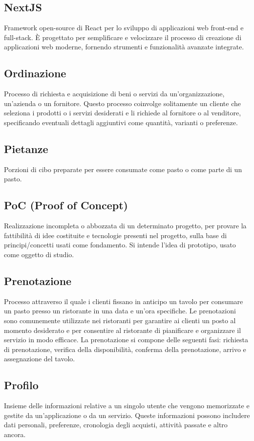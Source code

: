 \subsection{NextJS}Framework open-source di React per lo sviluppo di applicazioni web front-end e full-stack. È progettato per semplificare e velocizzare il processo di creazione di applicazioni web moderne, fornendo strumenti e funzionalità avanzate integrate.
\subsection{Ordinazione}Processo di richiesta e acquisizione di beni o servizi da un'organizzazione, un'azienda o un fornitore. Questo processo coinvolge solitamente un cliente che seleziona i prodotti o i servizi desiderati e li richiede al fornitore o al venditore, specificando eventuali dettagli aggiuntivi come quantità, varianti o preferenze.
\subsection{Pietanze}Porzioni di cibo preparate per essere consumate come pasto o come parte di un pasto.
\subsection{PoC (Proof of Concept)}Realizzazione incompleta o abbozzata di un determinato progetto, per provare la fattibilità di idee costituite e tecnologie presenti nel progetto, sulla base di principi/concetti usati come fondamento. Si intende l’idea di prototipo, usato come oggetto di studio.
\subsection{Prenotazione}Processo attraverso il quale i clienti fissano in anticipo un tavolo per consumare un pasto presso un ristorante in una data e un'ora specifiche. Le prenotazioni sono comunemente utilizzate nei ristoranti per garantire ai clienti un posto al momento desiderato e per consentire al ristorante di pianificare e organizzare il servizio in modo efficace. La prenotazione si compone delle seguenti fasi: richiesta di prenotazione, verifica della disponibilità, conferma della prenotazione, arrivo e assegnazione del tavolo.
\subsection{Profilo}Insieme delle informazioni relative a un singolo utente che vengono memorizzate e gestite da un'applicazione o da un servizio. Queste informazioni possono includere dati personali, preferenze, cronologia degli acquisti, attività passate e altro ancora.

